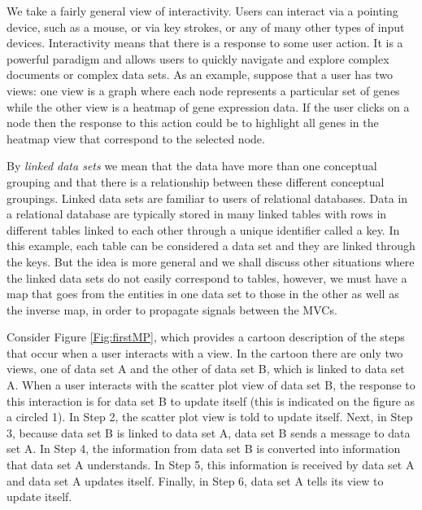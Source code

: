\documentclass{article}[11pt]
\newcommand{\Robject}[1]{{\texttt{#1}}}
\begin{document}
We take a fairly general view of interactivity. Users can interact via
a pointing device, such as a mouse, or via key strokes, or any of many
other types of input devices.  Interactivity means that there is a
response to some user action.  It is a powerful paradigm and allows
users to quickly navigate and explore complex documents or complex
data sets.  As an example, suppose that a user has two views: one view
is a graph where each node represents a particular set of genes while
the other view is a heatmap of gene expression data.  If the user
clicks on a node then the response to this action could be to
highlight all genes in the heatmap view that correspond to the
selected node.

By \textit{linked data sets} we mean that the data have more than one
conceptual grouping and that there is a relationship between these
different conceptual groupings.  Linked data sets are 
familiar to users of relational databases.  Data in a relational
database are typically stored in many linked tables with rows in
different tables linked to each other through a unique identifier
called a key.  In this example, each table can be considered a data set
and they are linked through the keys.  But the idea is more general
and we shall discuss other situations where the linked data sets do
not easily correspond to tables, however, we must have a map that goes
from the entities in one data set to those in the other as well as the
inverse map, in order to propagate signals between the MVCs.

Consider Figure \ref{Fig:firstMP}, which provides a cartoon
description of the steps that occur when a user interacts with a
view. In the cartoon there are only two views, one of data set A and the
other of data set B, which is linked to data set A.  When a user
interacts with the scatter plot view of data set B, the response to
this interaction is for data set B to update itself (this is indicated
on the figure as a circled 1).  In Step 2, the scatter plot view is
told to update itself.  Next, in Step 3, because data set B is linked
to data set A, data set B sends a message to data set A.  In Step 4,
the information from data set B is converted into information that
data set A understands.  In Step 5, this information is received by
data set A and data set A updates itself.  Finally, in Step 6, data
set A tells its view to update itself.

\end{document}
